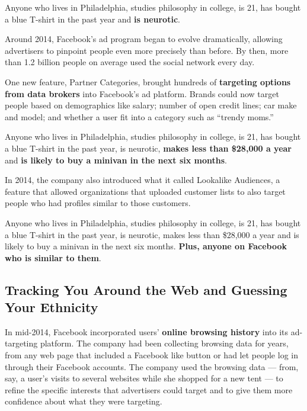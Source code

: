 Anyone who lives in Philadelphia, studies philosophy in college, is 21,
has bought a blue T-shirt in the past year and \textbf{is neurotic}.

Around 2014, Facebook's ad program began to evolve dramatically,
allowing advertisers to pinpoint people even more precisely than before.
By then, more than 1.2 billion people on average used the social network
every day.

One new feature, Partner Categories, brought hundreds of
\textbf{targeting options from data brokers} into Facebook's ad
platform. Brands could now target people based on demographics like
salary; number of open credit lines; car make and model; and whether a
user fit into a category such as ``trendy moms.''

Anyone who lives in Philadelphia, studies philosophy in college, is 21,
has bought a blue T-shirt in the past year, is neurotic, \textbf{makes
less than \$28,000 a year} and \textbf{is likely to buy a minivan in the
next six months}.

In 2014, the company also introduced what it called Lookalike Audiences,
a feature that allowed organizations that uploaded customer lists to
also target people who had profiles similar to those customers.

Anyone who lives in Philadelphia, studies philosophy in college, is 21,
has bought a blue T-shirt in the past year, is neurotic, makes less than
\$28,000 a year and is likely to buy a minivan in the next six months.
\textbf{Plus, anyone on Facebook who is similar to them}.

\hypertarget{tracking-you-around-the-web-and-guessing-your-ethnicity}{%
\subsection{Tracking You Around the Web and Guessing Your
Ethnicity}\label{tracking-you-around-the-web-and-guessing-your-ethnicity}}

In mid-2014, Facebook incorporated users' \textbf{online browsing
history} into its ad-targeting platform. The company had been collecting
browsing data for years, from any web page that included a Facebook like
button or had let people log in through their Facebook accounts. The
company used the browsing data --- from, say, a user's visits to several
websites while she shopped for a new tent --- to refine the specific
interests that advertisers could target and to give them more confidence
about what they were targeting.

